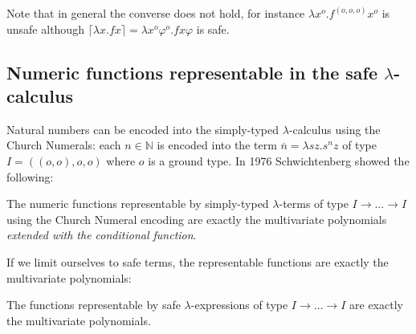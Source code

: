 \documentclass{llncs}
\newcommand{\elnf}[1]{\lceil #1\rceil} %
\newcommand{\encode}[1]{\overline{#1}} \newcommand\dps{\displaystyle}
\newcommand\nat{\mathbb{N}}
\begin{document}
Note that in general the converse does not hold, for instance $\lambda
x^o . f^{(o,o,o)} x^o$ is unsafe although $\elnf{\lambda x . f x} =
\lambda x^o \varphi^o . f x \varphi$ is safe.

\subsection*{Numeric functions representable in the safe $\lambda$-calculus}

Natural numbers can be encoded into the simply-typed
$\lambda$-calculus using the Church Numerals: each $n\in\nat$ is
encoded into the term $\encode{n} = \lambda s z. s^n z$ of type $I =
((o,o),o,o)$ where $o$ is a ground type. In 1976 Schwichtenberg
\cite{citeulike:622637} showed the following:


\begin{theorem}[Schwichtenberg 1976]
The numeric functions representable by simply-typed $\lambda$-terms of
type $I\rightarrow \ldots \rightarrow I$ using the Church Numeral
encoding are exactly the multivariate polynomials \emph{extended with
the conditional function}.
\end{theorem}

If we limit ourselves to safe terms, the representable functions are
exactly the multivariate polynomials:
\begin{theorem}
\label{thm:polychar}
The functions representable by safe $\lambda$-expressions of type
$I\rightarrow \ldots \rightarrow I$ are exactly the multivariate
polynomials.
\end{theorem}
\end{document}
